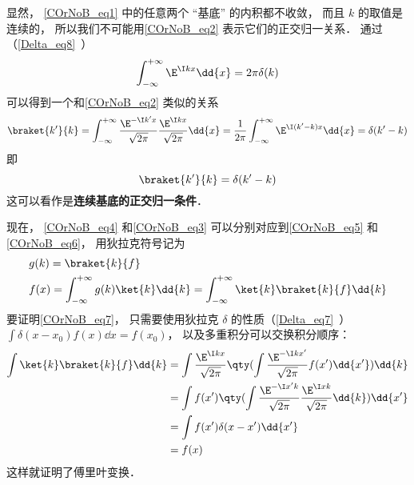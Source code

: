 显然， \autoref{COrNoB_eq1} 中的任意两个 “基底” 的内积都不收敛， 而且 $k$ 的取值是连续的， 所以我们不可能用\autoref{COrNoB_eq2} 表示它们的正交归一关系． 通过（\autoref{Delta_eq8}~）
\begin{equation}
\int_{-\infty}^{+\infty} \E^{\I kx}\dd{x} = 2\pi \delta(k)
\end{equation}
可以得到一个和\autoref{COrNoB_eq2} 类似的关系
\begin{equation}
\braket{k'}{k} = \int_{-\infty}^{+\infty} \frac{\E^{-\I k'x}}{\sqrt{2\pi}} \frac{\E^{\I kx}}{\sqrt{2\pi}}\dd{x}
= \frac{1}{2\pi}\int_{-\infty}^{+\infty} \E^{\I (k'-k)x}\dd{x}
= \delta(k' - k)
\end{equation}
即
\begin{equation}
\braket{k'}{k} = \delta(k' - k)
\end{equation}
这可以看作是\textbf{连续基底的正交归一条件}．

现在， \autoref{COrNoB_eq4} 和\autoref{COrNoB_eq3} 可以分别对应到\autoref{COrNoB_eq5} 和\autoref{COrNoB_eq6}， 用狄拉克符号记为
\begin{align}
&g(k) = \braket{k}{f}\\
\label{COrNoB_eq7}&f(x) = \int_{-\infty}^{+\infty} g(k) \ket{k} \dd{k} = \int_{-\infty}^{+\infty} \ket{k}\braket{k}{f} \dd{k}
\end{align}
要证明\autoref{COrNoB_eq7}， 只需要使用狄拉克 $\delta$ 的性质（\autoref{Delta_eq7}~） $\int \delta(x - x_0) f(x) \dd{x} = f(x_0)$， 以及多重积分可以交换积分顺序：
\begin{equation}
\begin{aligned}
\int \ket{k}\braket{k}{f} \dd{k} &= \int \frac{\E^{\I kx}}{\sqrt{2\pi }} \qty(\int \frac{\E^{-\I k x'}}{\sqrt{2\pi }} f(x') \dd{x'}) \dd{k}\\
&= \int f(x') \qty(\int \frac{\E^{-\I x' k}}{\sqrt{2\pi }}\frac{\E^{\I x k}}{\sqrt{2\pi }}\dd{k}) \dd{x'}\\
&= \int f(x') \delta (x - x') \dd{x'}\\
&= f(x)
\end{aligned}
\end{equation}
这样就证明了傅里叶变换．
